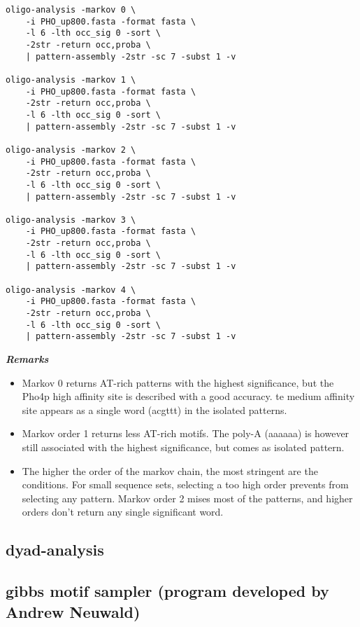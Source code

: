 \begin{verbatim}
oligo-analysis -markov 0 \
    -i PHO_up800.fasta -format fasta \
    -l 6 -lth occ_sig 0 -sort \
    -2str -return occ,proba \
    | pattern-assembly -2str -sc 7 -subst 1 -v

oligo-analysis -markov 1 \
    -i PHO_up800.fasta -format fasta \
    -2str -return occ,proba \
    -l 6 -lth occ_sig 0 -sort \
    | pattern-assembly -2str -sc 7 -subst 1 -v
	
oligo-analysis -markov 2 \
    -i PHO_up800.fasta -format fasta \
    -2str -return occ,proba \
    -l 6 -lth occ_sig 0 -sort \
    | pattern-assembly -2str -sc 7 -subst 1 -v
	
oligo-analysis -markov 3 \
    -i PHO_up800.fasta -format fasta \
    -2str -return occ,proba \
    -l 6 -lth occ_sig 0 -sort \
    | pattern-assembly -2str -sc 7 -subst 1 -v
	
oligo-analysis -markov 4 \
    -i PHO_up800.fasta -format fasta \
    -2str -return occ,proba \
    -l 6 -lth occ_sig 0 -sort \
    | pattern-assembly -2str -sc 7 -subst 1 -v
\end{verbatim}

\textit{\textbf{Remarks}}
\begin{itemize}
\item 
Markov 0 returns AT-rich patterns with the highest significance, but
the Pho4p high affinity site is described with a good accuracy. te
medium affinity site appears as a single word (acgttt) in the isolated
patterns.
\item 
Markov order 1 returns less AT-rich motifs. The poly-A (aaaaaa) is
however still associated with the highest significance, but comes as
isolated pattern.
\item 
The higher the order of the markov chain, the most stringent are the
conditions. For small sequence sets, selecting a too high order
prevents from selecting any pattern. Markov order 2 mises most of the
patterns, and higher orders don't return any single significant word.
\end{itemize}

\subsection{dyad-analysis}



\subsection{gibbs motif sampler (program developed by Andrew Neuwald)}




